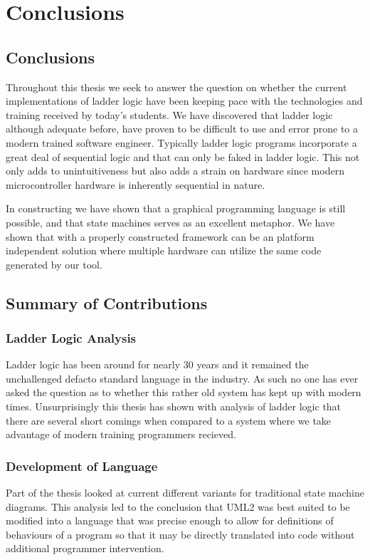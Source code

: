 \section{Conclusions}

\subsection{Conclusions}

Throughout this thesis we seek to answer the question on whether the 
current implementations of ladder logic have been keeping pace with 
the technologies and training received by today's students. We have 
discovered that ladder logic although adequate before, have proven to 
be difficult to use and error prone to a modern trained software engineer. 
Typically ladder logic programs incorporate a great deal of sequential 
logic and that can only be faked in ladder logic. This not only adds to 
unintuitiveness but also adds a strain on hardware since modern 
microcontroller hardware is inherently sequential in nature.

In constructing \plccharts we have shown that a graphical programming 
language is still possible, and that state machines serves as an excellent 
metaphor. We have shown that with a properly constructed 
framework \plccharts can be an platform independent solution where 
multiple hardware can utilize the same  
code generated by our tool. 


\subsection{Summary of Contributions}

\subsubsection{Ladder Logic Analysis}
Ladder logic has been around for nearly 30 years and it remained the 
unchallenged defacto standard language in the industry. As such no 
one has ever asked the question as to whether this rather old system 
has kept up with modern times. Unsurprisingly this thesis has shown 
with analysis of ladder logic that there are several short comings when 
compared to a system where we take advantage of modern training 
programmers recieved. 


\subsubsection{Development of \plccharts Language}
Part of the thesis looked at current different variants for traditional state machine diagrams. 
This analysis led to the conclusion that UML2 was best suited to be modified into a language 
that was precise enough to allow for definitions of behaviours of a program so that it may 
be directly translated into code without additional programmer intervention.

